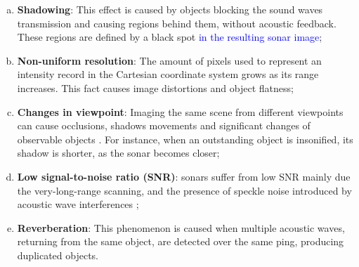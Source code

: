 \documentclass[final,5p,times]{elsarticle}
\begin{document}
\begin{enumerate}[(a)]
    \item \textbf{Shadowing}: This effect is caused by objects blocking the
sound waves transmission and causing regions behind them, without acoustic feedback. These regions are defined by a black spot \textcolor{blue}{in the resulting sonar image};
    \item \textbf{Non-uniform resolution}: The amount of pixels used to represent an intensity record in the Cartesian coordinate system grows as    its range increases. This fact causes image distortions and object flatness;
    \item \textbf{Changes in viewpoint}: Imaging the same scene from different viewpoints can cause occlusions, shadows movements and significant  changes of observable objects \cite{hurtos2014}. For instance, when an    outstanding object is insonified, its shadow is shorter, as the sonar becomes closer;
    \item \textbf{Low signal-to-noise ratio (SNR)}: sonars suffer from low SNR mainly due the very-long-range scanning, and the presence of speckle noise introduced by acoustic wave interferences \cite{abbott1979};
    \item \textbf{Reverberation}: This phenomenon is caused when multiple acoustic waves, returning from the same object, are detected over the same ping, producing duplicated objects.
\end{enumerate}
\end{document}
